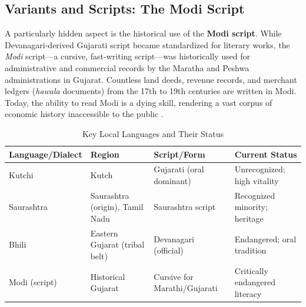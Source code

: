 \documentclass[12pt]{article}
\begin{document}
\subsection{Variants and Scripts: The Modi Script}
A particularly hidden aspect is the historical use of the \textbf{Modi script}. While Devanagari-derived Gujarati script became standardized for literary works, the \textit{Modi} script—a cursive, fast-writing script—was historically used for administrative and commercial records by the Maratha and Peshwa administrations in Gujarat. Countless land deeds, revenue records, and merchant ledgers (\textit{hawala} documents) from the 17th to 19th centuries are written in Modi. Today, the ability to read Modi is a dying skill, rendering a vast corpus of economic history inaccessible to the public \cite{choksi2020}.

\begin{table}[h!]
\centering
\caption{Key Local Languages and Their Status}
\label{tab:languages}
\begin{tabular}{|p{2.5cm}|p{4cm}|p{4cm}|p{3cm}|}
\hline
\textbf{Language/Dialect} & \textbf{Region} & \textbf{Script/Form} & \textbf{Current Status} \\
\hline
Kutchi & Kutch & Gujarati (oral dominant) & Unrecognized; high vitality \\
\hline
Saurashtra & Saurashtra (origin), Tamil Nadu & Saurashtra script & Recognized minority; heritage \\
\hline
Bhili & Eastern Gujarat (tribal belt) & Devanagari (official) & Endangered; oral tradition \\
\hline
Modi (script) & Historical Gujarat & Cursive for Marathi/Gujarati & Critically endangered literacy \\
\hline
\end{tabular}
\end{table}
\end{document}
